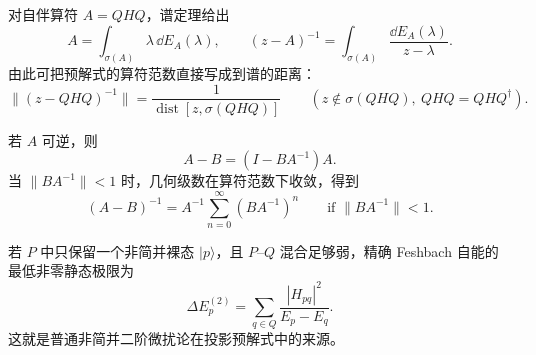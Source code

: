 
对自伴算符 $A=QHQ$，谱定理给出
\begin{equation}
 \boxed{
 A=\int_{\sigma(A)}\lambda\,\dd E_A(\lambda),
 \qquad
 (z-A)^{-1}=\int_{\sigma(A)}\frac{\dd E_A(\lambda)}{z-\lambda}.}
 \label{eq:resolvent-spectral-resolution-dp68}
\end{equation}
由此可把预解式的算符范数直接写成到谱的距离：
\begin{equation}
\boxed{
\|(z-QHQ)^{-1}\|
=\frac1{\operatorname{dist}[z,\sigma(QHQ)]}}
\qquad
(z\notin\sigma(QHQ),\ QHQ=QHQ^\dagger).
\label{eq:resolvent-norm-spectral-dp21}
\end{equation}

若 $A$ 可逆，则
\begin{equation}
 \boxed{A-B=(I-BA^{-1})A.}
 \label{eq:neumann-factorization-dp68}
\end{equation}
当 $\|BA^{-1}\|<1$ 时，几何级数在算符范数下收敛，得到
\begin{equation}
\boxed{
(A-B)^{-1}=A^{-1}\sum_{n=0}^{\infty}(BA^{-1})^n}
\qquad
\text{if }\|BA^{-1}\|<1.
\label{eq:operator-neumann-resolvent-dp21}
\end{equation}

若 $P$ 中只保留一个非简并裸态 $|p\rangle$，且 $P$--$Q$ 混合足够弱，精确 Feshbach 自能的最低非零静态极限为
\begin{equation}
 \boxed{
 \Delta E_p^{(2)}
 =\sum_{q\in Q}
 \frac{|H_{pq}|^2}{E_p-E_q}.}
 \label{eq:feshbach-second-order-static-dp68}
\end{equation}
这就是普通非简并二阶微扰论在投影预解式中的来源。
